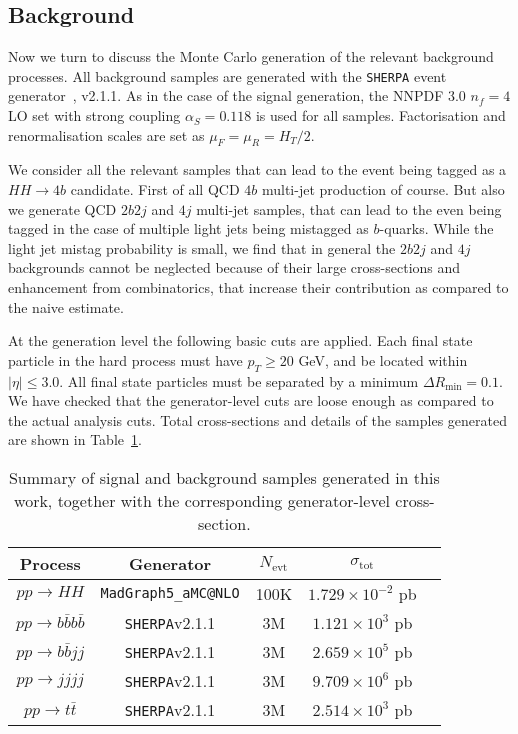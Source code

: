 \subsection{Background}

Now we turn to discuss the Monte Carlo generation of the relevant background processes.
%
All background samples are generated with the {\tt SHERPA} event generator~\cite{Gleisberg:2008ta}, v2.1.1.
%
As in the case of the signal generation, the NNPDF 3.0 $n_f = 4$ LO set with strong coupling $\alpha_S=0.118$ is used for all samples.
Factorisation and renormalisation scales are set as $\mu_F=\mu_R=H_T/2$.

We consider all the relevant samples that can lead to the event
being tagged as a $HH\to 4b$ candidate.
%
First of all QCD $4b$ multi-jet production of course.
%
But also we generate QCD $2b2j$ and $4j$ multi-jet samples,
that can lead to the even being tagged in the case of multiple light
jets being mistagged as $b$-quarks.
%
While the light jet mistag probability is small, we find that
in general the $2b2j$ and $4j$ backgrounds cannot be neglected because
of their large cross-sections and enhancement from combinatorics, that
increase their contribution as compared to the naive estimate.

At the generation level the following basic cuts are applied.
%
Each final state particle in the hard process must have $p_T \ge 20$ GeV, and be located within $| \eta | \le 3.0$. All final state particles must be separated by a minimum $\Delta R_{\mathrm{min}} =0.1$.
%
We have checked that the generator-level cuts are loose enough as compared to the actual
analysis cuts.
%
Total cross-sections and details of the samples generated are shown in Table~\ref{tab:samples}. 


\begin{table}[h]
\begin{center}
\begin{tabular}{|c|c|c|c|c|}
\hline
Process &  Generator & $N_{\mathrm{evt}}$ & $\sigma_{\mathrm{tot}}$ \\
\hline
\hline
$pp \to HH$ &  {\tt MadGraph5\_aMC@NLO} & 100K & $1.729\times10^{-2}$ pb \\
\hline
\hline
$pp \to b\bar{b}b\bar{b}$ &  {\tt SHERPA}v2.1.1 & 3M &$1.121 \times10^3$ pb \\
$pp \to b\bar{b}jj$ &  {\tt SHERPA}v2.1.1 & 3M & $2.659 \times 10^5$ pb \\
$pp \to jjjj$ &  {\tt SHERPA}v2.1.1 & 3M  & $9.709\times 10^6$ pb \\
$pp \to t\bar{t}$ &  {\tt SHERPA}v2.1.1 & 3M & $2.514\times 10^3$ pb \\
\hline
\end{tabular}
\caption{\small Summary of signal and background samples generated in this work,
together with the corresponding generator-level cross-section.} \label{tab:samples}
\end{center}
\end{table}%

